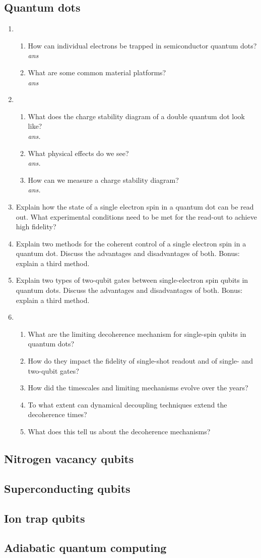 \documentclass[a4paper]{scrartcl}
\newcommand{\qa}[2]{#1\\ \textit{#2}}
\begin{document}
\subsection*{Quantum dots}
\begin{enumerate}[label=(\alph*)]
  \item \begin{enumerate}[label=(\roman*)]
    \item \qa{How can individual electrons be trapped in semiconductor quantum dots?}{ans}
    \item \qa{What are some common material platforms?}{ans}
  \end{enumerate}

  \item \begin{enumerate}[label=(\roman*)]
    \item \qa{What does the charge stability diagram of a double quantum dot look like?}{ans.}
    \item \qa{What physical effects do we see?}{ans.}
    \item \qa{How can we measure a charge stability diagram?}{ans.}
  \end{enumerate}

  \item \qa{Explain how the state of a single electron spin in a quantum dot can be read out. What experimental conditions need to be met for the read-out to achieve high fidelity?}{}
  \item \qa{Explain two methods for the coherent control of a single electron spin in a quantum dot. Discuss the advantages and disadvantages of both. Bonus: explain a third method.}{}
  \item \qa{Explain two types of two-qubit gates between single-electron spin qubits in quantum dots. Discuss the advantages and disadvantages of both. Bonus: explain a third method.}{}
  \item \begin{enumerate}[label=(\roman*)]
    \item \qa{What are the limiting decoherence mechanism for single-spin qubits in quantum dots?}{}
    \item \qa{How do they impact the fidelity of single-shot readout and of single- and two-qubit gates?}{}
    \item \qa{How did the timescales and limiting mechanisms evolve over the years?}{}
    \item \qa{To what extent can dynamical decoupling techniques extend the decoherence times?}{}
    \item \qa{What does this tell us about the decoherence mechanisms?}{}
  \end{enumerate}
\end{enumerate}
\subsection*{Nitrogen vacancy qubits}
\subsection*{Superconducting qubits}
\subsection*{Ion trap qubits}
\subsection*{Adiabatic quantum computing}
\end{document}
